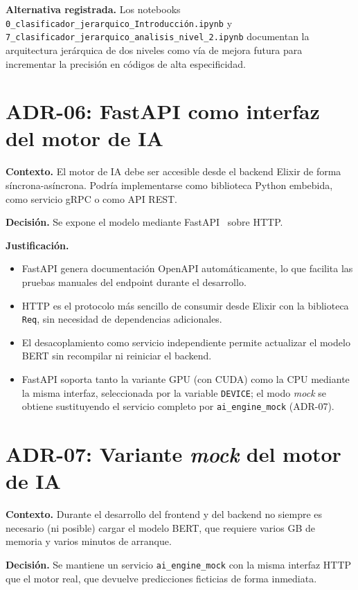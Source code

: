 \textbf{Alternativa registrada.} Los notebooks \texttt{0\_clasificador\_jerarquico\_Introducción.ipynb} y \texttt{7\_clasificador\_jerarquico\_analisis\_nivel\_2.ipynb} documentan la arquitectura jerárquica de dos niveles como vía de mejora futura para incrementar la precisión en códigos de alta especificidad.

\section{ADR-06: FastAPI como interfaz del motor de IA}

\textbf{Contexto.} El motor de IA debe ser accesible desde el backend Elixir de forma síncrona-asíncrona. Podría implementarse como biblioteca Python embebida, como servicio gRPC o como API REST.

\textbf{Decisión.} Se expone el modelo mediante FastAPI~\cite{fastapi2024} sobre HTTP.

\textbf{Justificación.}
\begin{itemize}
    \item FastAPI genera documentación OpenAPI automáticamente, lo que facilita las pruebas manuales del endpoint durante el desarrollo.
    \item HTTP es el protocolo más sencillo de consumir desde Elixir con la biblioteca \texttt{Req}, sin necesidad de dependencias adicionales.
    \item El desacoplamiento como servicio independiente permite actualizar el modelo BERT sin recompilar ni reiniciar el backend.
    \item FastAPI soporta tanto la variante GPU (con CUDA) como la CPU mediante la misma interfaz, seleccionada por la variable \texttt{DEVICE}; el modo \emph{mock} se obtiene sustituyendo el servicio completo por \texttt{ai\_engine\_mock} (ADR-07).
\end{itemize}

\section{ADR-07: Variante \emph{mock} del motor de IA}

\textbf{Contexto.} Durante el desarrollo del frontend y del backend no siempre es necesario (ni posible) cargar el modelo BERT, que requiere varios GB de memoria y varios minutos de arranque.

\textbf{Decisión.} Se mantiene un servicio \texttt{ai\_engine\_mock} con la misma interfaz HTTP que el motor real, que devuelve predicciones ficticias de forma inmediata.

